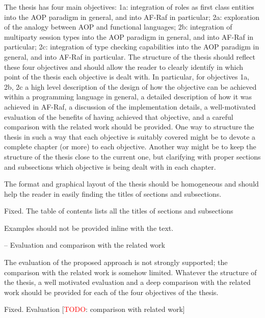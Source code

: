 \documentclass{article}
\newcommand{\todo}[1]{[\textcolor{red}{TODO}: #1]}
\newenvironment{them}{\noindent\begingroup\color{blue}}{\endgroup\par}
\begin{document}
\begin{them}
The thesis has four main objectives: 1a: integration of roles as first class entities into the AOP paradigm in general, and into AF-Raf in particular; 2a: exploration of the analogy between AOP and functional languages; 2b: integration of multiparty session types into the AOP paradigm in general, and into AF-Raf in particular; 2c: integration of type checking capabilities into the AOP paradigm in general, and into AF-Raf in particular.
The structure of the thesis should reflect these four objectives and should allow the reader to clearly identify in which point of the thesis each objective is dealt with. In particular, for objectives 1a, 2b, 2c a high level description of the design of how the objective can be achieved within a programming language in general, a detailed description of how it was achieved in AF-Raf, a discussion of the implementation details, a well-motivated evaluation of the benefits of having achieved that objective, and a careful comparison with the related work should be provided.
One way to structure the thesis in such a way that each objective is suitably covered might be to devote a complete chapter (or more) to each objective. Another way might be to keep the structure of the thesis close to the current one, but clarifying with proper sections and subsections which objective is being dealt with in each chapter.
\end{them}
\todo{clarify this}

\begin{them}
The format and graphical layout of the thesis should be homogeneous and should help the reader in easily finding the titles of sections and subsections.
\end{them}
Fixed. The table of contents lists all the titles of sections and subsections

\begin{them}
 Examples should not be provided inline with the text.
\end{them}
\todo{I have no idea what you mean!}

\begin{them}
-- Evaluation and comparison with the related work

The evaluation of the proposed approach is not strongly supported; the comparison with the related work is somehow limited. Whatever the structure of the thesis, a well motivated evaluation and a deep comparison with the related work should be provided for each of the four objectives of the
thesis.
\end{them}
Fixed. Evaluation
\todo{comparison with related work}
\end{document}
